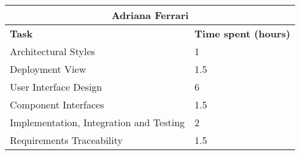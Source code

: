 \begin{table}[h]
  \center
  \begin{tabular}{l|l}
    \multicolumn{2}{c}{\textbf{Adriana Ferrari}} \\
    \hline
    \textbf{Task} & \textbf{Time spent (hours)}\\
    \hline
    Architectural Styles & 1 \\
    Deployment View & 1.5 \\
    User Interface Design & 6 \\
    Component Interfaces & 1.5 \\ 
    Implementation, Integration and Testing & 2 \\
    Requirements Traceability & 1.5 \\
  \end{tabular}
\end{table}